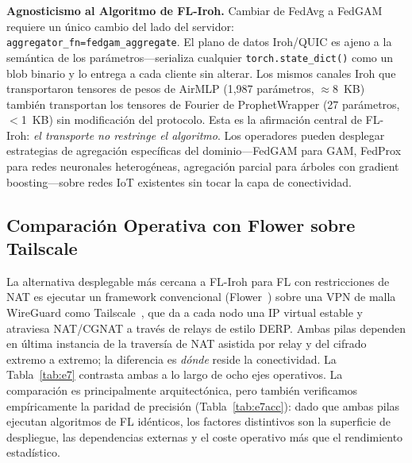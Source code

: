 \documentclass[journal]{IEEEtran}
\begin{document}
\textbf{Agnosticismo al Algoritmo de FL-Iroh.} Cambiar de FedAvg a FedGAM requiere un único cambio del lado del servidor: \texttt{aggregator\_fn=fedgam\_aggregate}. El plano de datos Iroh/QUIC es ajeno a la semántica de los parámetros---serializa cualquier \texttt{torch.state\_dict()} como un blob binario y lo entrega a cada cliente sin alterar. Los mismos canales Iroh que transportaron tensores de pesos de AirMLP (1{,}987 parámetros, $\approx$8~KB) también transportan los tensores de Fourier de ProphetWrapper (27 parámetros, $<$1~KB) sin modificación del protocolo. Esta es la afirmación central de FL-Iroh: \emph{el transporte no restringe el algoritmo}. Los operadores pueden desplegar estrategias de agregación específicas del dominio---FedGAM para GAM, FedProx para redes neuronales heterogéneas, agregación parcial para árboles con gradient boosting---sobre redes IoT existentes sin tocar la capa de conectividad.

\subsection{Comparación Operativa con Flower sobre Tailscale}
\label{sec:e7}

La alternativa desplegable más cercana a FL-Iroh para FL con restricciones de NAT es ejecutar un framework convencional (Flower~\cite{flower2022}) sobre una VPN de malla WireGuard como Tailscale~\cite{tailscale2023}, que da a cada nodo una IP virtual estable y atraviesa NAT/CGNAT a través de relays de estilo DERP. Ambas pilas dependen en última instancia de la traversía de NAT asistida por relay y del cifrado extremo a extremo; la diferencia es \emph{dónde} reside la conectividad. La Tabla~\ref{tab:e7} contrasta ambas a lo largo de ocho ejes operativos. La comparación es principalmente arquitectónica, pero también verificamos empíricamente la paridad de precisión (Tabla~\ref{tab:e7acc}): dado que ambas pilas ejecutan algoritmos de FL idénticos, los factores distintivos son la superficie de despliegue, las dependencias externas y el coste operativo más que el rendimiento estadístico.
\end{document}
